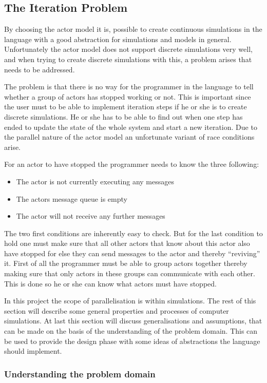 \subsection{The Iteration Problem}
By choosing the actor model it is, possible to create continuous simulations in the language with a good abstraction for simulations and models in general. Unfortunately the actor model does not support discrete simulations very well, and when trying to create discrete simulations with this, a problem arises that needs to be addressed.

The problem is that there is no way for the programmer in the language to tell whether a group of actors has stopped working or not. This is important since the user must to be able to implement iteration steps if he or she is to create discrete simulations. He or she has to be able to find out when one step has ended to update the state of the whole system and start a new iteration. Due to the parallel nature of the actor model an unfortunate variant of race conditions arise.

For an actor to have stopped the programmer needs to know the three following:
\begin{itemize}
\item The actor is not currently executing any messages
\item The actors message queue is empty
\item The actor will not receive any further messages
\end{itemize}

The two first conditions are inherently easy to check. But for the last condition to hold one must make sure that all other actors that know about this actor also have stopped for else they can send messages to the actor and thereby \enquote{reviving} it. First of all the programmer must be able to group actors together thereby making sure that only actors in these groups can communicate with each other. This is done so he or she can know what actors must have stopped.

In this project the scope of parallelisation is within simulations. The rest of this section will describe some general properties and processes of computer simulations. At last this section will discuss generalisations and assumptions, that can be made on the basis of the understanding of the problem domain. This can be used to provide the design phase with some ideas of abstractions the language should implement.

\subsubsection{Understanding the problem domain}

